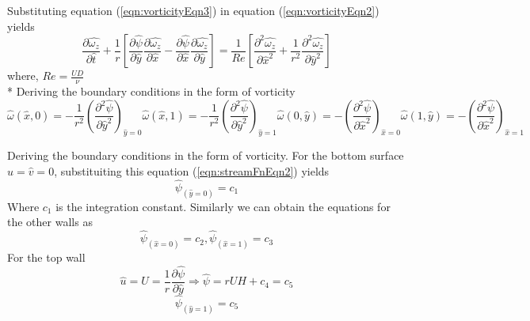 \documentclass{article}
\begin{document}
Substituting equation (\ref{eqn:vorticityEqn3}) in equation (\ref{eqn:vorticityEqn2}) yields 
\begin{equation}
\label{eqn:vorticityEqn4}
\frac{\partial \hat{\omega_z}}{\partial \hat{t}} +\frac{1}{r}\left[\frac{\partial \hat{\psi}}{\partial \hat{y}}\frac{\partial \hat{\omega_z}}{\partial \hat{x}} - \frac{\partial \hat{\psi}}{\partial \hat{x}}\frac{\partial \hat{\omega_z}}{\partial \hat{y}}\right]= \frac{1}{Re} \left [ \frac{\partial^2 \hat{\omega_z}}{\partial \hat{x}^2} +  \frac{1}{r^2}\frac{\partial^2 \hat{\omega_z}}{\partial \hat{y}^2} \right ]
\end{equation}
where, $Re = \frac{UD}{\nu}$
\\*
Deriving the boundary conditions in the form of vorticity
\begin{subequations}
\begin{equation}
\hat{\omega}(\hat{x},0) = - \frac{1}{r^2}\left(\frac{\partial^2 \hat{\psi}}{\partial \hat{y}^2}\right)_{\hat{y}=0}
\end{equation}
\begin{equation}
\hat{\omega}(\hat{x},1) = - \frac{1}{r^2}\left(\frac{\partial^2 \hat{\psi}}{\partial \hat{y}^2}\right)_{\hat{y}=1}
\end{equation}
\begin{equation}
\hat{\omega}(0,\hat{y}) = -\left(\frac{\partial^2 \hat{\psi}}{\partial \hat{x}^2}\right)_{\hat{x}=0}
\end{equation}
\begin{equation}
\hat{\omega}(1,\hat{y}) = -\left(\frac{\partial^2 \hat{\psi}}{\partial \hat{x}^2}\right)_{\hat{x}=1}
\end{equation}
\end{subequations}

Deriving the boundary conditions in the form of vorticity. For the bottom surface $\hat{u}=\hat{v}=0$, substituiting this equation (\ref{eqn:streamFnEqn2}) yields 
\begin{equation}
\hat{\psi}_{(\hat{y}=0)} = c_1
\end{equation}
Where $c_1$ is the integration constant. Similarly we can obtain the equations for the other walls as
\begin{equation}
\hat{\psi}_{(\hat{x}=0)} = c_2, \hat{\psi}_{(\hat{x}=1)} = c_3 
\end{equation}
For the top wall
\begin{equation}
\hat{u} = U =  \frac{1}{r}\frac{\partial \hat{\psi}}{\partial \hat{y}}  \Rightarrow \hat{\psi} = rUH+c_4  =c_5
\end{equation}
\begin{equation}
\hat{\psi}_{(\hat{y}=1)} = c_5
\end{equation}
\end{document}
